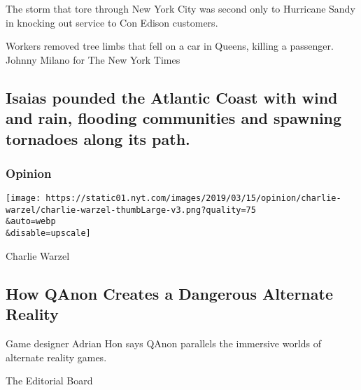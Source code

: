 The storm that tore through New York City was second only to Hurricane
Sandy in knocking out service to Con Edison customers.

\href{/2020/08/04/nyregion/isaias-ny.html}{}

\href{/2020/08/04/nyregion/isaias-ny.html}{}

Workers removed tree limbs that fell on a car in Queens, killing a
passenger. Johnny Milano for The New York Times

\href{/2020/08/04/us/hurricane-isaias-updates.html}{}

\hypertarget{isaias-pounded-the-atlantic-coast-with-wind-and-rain-flooding-communities-and-spawning-tornadoes-along-its-path}{%
\subsection{Isaias pounded the Atlantic Coast with wind and rain,
flooding communities and spawning tornadoes along its
path.}\label{isaias-pounded-the-atlantic-coast-with-wind-and-rain-flooding-communities-and-spawning-tornadoes-along-its-path}}

\href{https://www.nytimes.com/section/opinion?pagetype=Homepage\&action=click\&module=Opinion}{}

\hypertarget{opinion}{%
\subsubsection{Opinion}\label{opinion}}

\href{/2020/08/04/opinion/qanon-conspiracy-theory-arg.html}{}

\texttt{[image: https://static01.nyt.com/images/2019/03/15/opinion/charlie-warzel/charlie-warzel-thumbLarge-v3.png?quality=75\\\&auto=webp\\\&disable=upscale]}

Charlie Warzel

\hypertarget{how-qanon-creates-a-dangerous-alternate-reality}{%
\subsection{How QAnon Creates a Dangerous Alternate
Reality}\label{how-qanon-creates-a-dangerous-alternate-reality}}

Game designer Adrian Hon says QAnon parallels the immersive worlds of
alternate reality games.

\href{/2020/08/04/opinion/cuomo-de-blasio-coronavirus-nyc.html}{}

The Editorial Board

